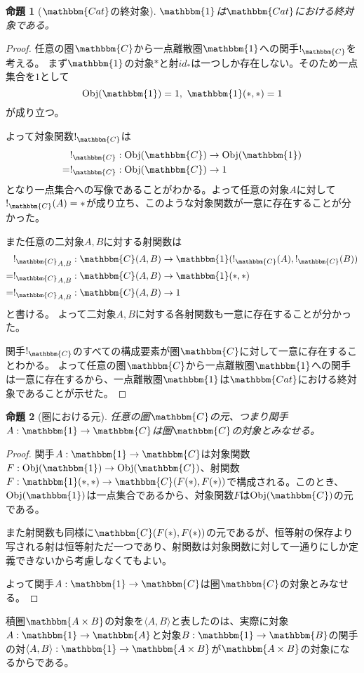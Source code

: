 \documentclass[dvipdfmx]{jsarticle}
\newcommand{\cat}[1]{\mathbbm{#1}}
\newcommand{\arrow}{\rightarrow}
\newcommand{\functor}[3]{#1:\cat{#2}\arrow \cat{#3}}
\newcommand{\tuple}[1]{\langle #1\rangle}
\newcommand{\obj}[1]{\mathrm{Obj}(\cat{#1})}
\newcommand{\mor}[3]{#1:#2\arrow #3}
\newcommand{\arset}[3]{\cat{#1}(#2,#3)}
\newtheorem{proof}{証明}[section]
\newtheorem{prop}{命題}[section]
\numberwithin{proof}{subsection}
\numberwithin{prop}{subsection}
\numberwithin{define}{subsection}
\begin{document}
	\begin{prop}[$\cat{Cat}$の終対象]
		$\cat{1}$は$\cat{Cat}$における終対象である。
	\end{prop}
	\begin{proof}
		任意の圏$\cat{C}$から一点離散圏$\cat{1}$への関手$!_{\cat{C}}$を考える。
		まず$\cat{1}$の対象$*$と射$id_*$は一つしか存在しない。そのため一点集合を$1$として
		\[\obj{1}=1,\ \arset{1}{*}{*}=1\]が成り立つ。

		よって対象関数$!_{\cat{C}}$は
		\begin{align*}
			&\mor{!_{\cat{C}}}{\obj{C}}{\obj{1}}\\
			=&\mor{!_{\cat{C}}}{\obj{C}}{1}
		\end{align*}
		となり一点集合への写像であることがわかる。よって任意の対象$A$に対して$!_{\cat{C}}(A)=*$が成り立ち、このような対象関数が一意に存在することが分かった。

		また任意の二対象$A,B$に対する射関数は
		\begin{align*}
			&\mor{{!_{\cat{C}}}_{A,B}}{\arset{C}{A}{B}}{\arset{1}{!_{\cat{C}}(A)}{!_{\cat{C}}(B)}}\\
			=&\mor{{!_{\cat{C}}}_{A,B}}{\arset{C}{A}{B}}{\arset{1}{*}{*}}\\
			=&\mor{{!_{\cat{C}}}_{A,B}}{\arset{C}{A}{B}}{1}\\
		\end{align*}と書ける。
		よって二対象$A,B$に対する各射関数も一意に存在することが分かった。

		関手$!_{\cat{C}}$のすべての構成要素が圏$\cat{C}$に対して一意に存在することわかる。
		よって任意の圏$\cat{C}$から一点離散圏$\cat{1}$への関手は一意に存在するから、一点離散圏$\cat{1}$は$\cat{Cat}$における終対象であることが示せた。
	\end{proof}
	\begin{prop}[圏における元]
		任意の圏$\cat{C}$の元、つまり関手$\functor{A}{1}{C}$は圏$\cat{C}$の対象とみなせる。
	\end{prop}
	\begin{proof}
		関手$\functor{A}{1}{C}$は対象関数$\mor{F}{\obj{1}}{\obj{C}}$、射関数$\mor{F}{\arset{1}{*}{*}}{\arset{C}{F(*)}{F(*)}}$で構成される。このとき、$\obj{1}$は一点集合であるから、対象関数$F$は$\obj{C}$の元である。

		また射関数も同様に$\arset{C}{F(*)}{F(*)}$の元であるが、恒等射の保存より写される射は恒等射ただ一つであり、射関数は対象関数に対して一通りにしか定義できないから考慮しなくてもよい。

		よって関手$\functor{A}{1}{C}$は圏$\cat{C}$の対象とみなせる。
	\end{proof}
	積圏$\cat{A\times B}$の対象を$\tuple{A,B}$と表したのは、実際に対象$\functor{A}{1}{A}$と対象$\functor{B}{1}{B}$の関手の対$\functor{\tuple{A,B}}{1}{A\times B}$が$\cat{A\times B}$の対象になるからである。
\end{document}
